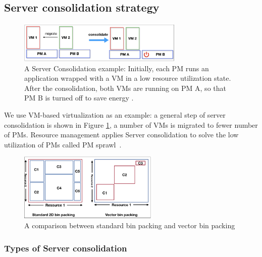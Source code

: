 \subsection{Server consolidation strategy}
\label{consolidation}

\begin{figure}
	\centering
	\includegraphics[width=0.7\textwidth]{pics/consolidate.png}
	\caption{A Server Consolidation example: Initially, each PM runs an application wrapped with a VM in a low resource utilization state. After the consolidation, both VMs are running on PM A, so that PM B is turned off to save energy \cite{Barroso:2007jt}.}
	\label{fig:consolidation}
\end{figure}


 We use VM-based virtualization as an example: a general step of server consolidation is shown in Figure \ref{fig:consolidation}, a number of VMs is migrated to fewer number of PMs. Resource management applies Server consolidation to solve 
the low utilization of PMs called PM sprawl~\cite{Khanna:2006vq}.

\begin{figure}
	\centering
	\includegraphics[width=0.6\textwidth]{pics/bin_packing_problem.png}
	\caption{A comparison between standard bin packing and vector bin packing}
	\label{fig:bin_packing_problem}
\end{figure}

\subsubsection{Types of Server consolidation}


